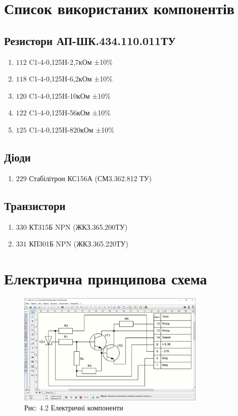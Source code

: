 \documentclass[a4paper]{article}
\begin{document}
\newpage

\section*{Список використаних компонентів}
\subsection*{Резистори АП-ШК.434.110.011ТУ}
\begin{enumerate}
    \item $112$ C1-4-0,125H-2,7кОм ±10\%
    \item $118$ C1-4-0,125H-6,2кОм ±10\%
    \item $120$ C1-4-0,125H-10кОм ±10\%
    \item $122$ C1-4-0,125H-56кОм ±10\%
    \item $125$ C1-4-0,125H-820кОм ±10\%
\end{enumerate} 

\subsection*{Діоди}
\begin{enumerate}
    \item $229$ Стабілітрон КС156А (СМ3.362.812 ТУ)
\end{enumerate}

\subsection*{Транзистори}
\begin{enumerate}
    \item $330$ КТ315Б NPN (ЖКЗ.365.200ТУ)
    \item $331$ КП301Б NPN (ЖКЗ.365.220ТУ)
\end{enumerate}

\section*{Електрична принципова схема}
\begin{figure}[h]
    \centering
    \includegraphics[width=0.8\textwidth]{imgs/PW4.2.png}
    \caption*{Рис: 4.2 Електричні компоненти}
\end{figure}
\end{document}
